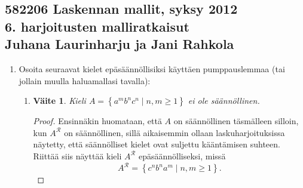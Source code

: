 \documentclass[a4paper,11pt]{article}
\newtheorem*{claim}{Väite}
\newcommand{\set}[1]{{\left\{ #1 \right\}}}
\begin{document}
\subsection*{582206 Laskennan mallit, syksy 2012 \\
  \textmd{6. harjoitusten malliratkaisut \\
    Juhana Laurinharju ja Jani Rahkola}}

\begin{enumerate}

  \subsubsection*{Säännölliset kielet}

\item
  Osoita seuraavat kielet epäsäännöllisiksi käyttäen
  pumppauslemmaa (tai jollain muulla haluamallasi tavalla):
  \begin{enumerate}
  \item
    \begin{claim}
        Kieli $A = \set{a^m b^n c^n \mid n,m\geq 1}$ ei ole säännöllinen.
    \end{claim}

    \begin{proof}
            Ensinnäkin huomataan, että $A$ on säännöllinen täsmälleen silloin, kun
            $A^\mathcal{R}$ on säännöllinen, sillä aikaisemmin ollaan laskuharjoituksissa
            näytetty, että säännölliset kielet ovat suljettu kääntämisen suhteen.
            Riittää siis näyttää kieli $A^\mathcal{R}$ epäsäännölliseksi, missä
            \begin{equation*}
              A^\mathcal{R} = \set{c^nb^na^m \mid n,m \geq 1}.
            \end{equation*}
        

\end{proof}
\end{enumerate}
\end{enumerate}
\end{document}
